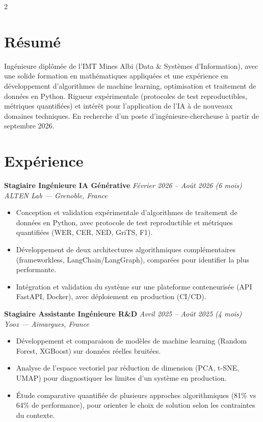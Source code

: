 \documentclass[10.5pt,a4paper]{article}
\newcommand{\sectionrule}{\vspace{-6pt}{\color{accent}\hrule height 1pt}\vspace{3pt}}
\newcommand{\cvexp}[5]{%
  \noindent\textbf{#1} \hfill {\itshape\color{graytext}\small #4}\\
  {\itshape #2 --- #3}\\[-2pt]
  #5
  \vspace{4pt}
}
\begin{document}
\setlength{\columnsep}{1.5em}
\begin{paracol}{2}

\section*{Résumé}
\sectionrule
\justifying
Ingénieure diplômée de l'IMT Mines Albi (Data \& Systèmes d'Information), avec une solide formation en mathématiques appliquées et une expérience en développement d'algorithmes de machine learning, optimisation et traitement de données en Python. Rigueur expérimentale (protocoles de test reproductibles, métriques quantifiées) et intérêt pour l'application de l'IA à de nouveaux domaines techniques. En recherche d'un poste d'ingénieure-chercheuse à partir de septembre 2026.

\section*{Expérience}
\sectionrule

\cvexp{Stagiaire Ingénieure IA Générative}{ALTEN Lab}{Grenoble, France}{Février 2026 -- Août 2026 (6 mois)}{%
  \begin{itemize}[leftmargin=12pt, itemsep=2pt, topsep=0pt, partopsep=0pt, parsep=0pt]
    \item Conception et validation expérimentale d'algorithmes de traitement de données en Python, avec protocole de test reproductible et métriques quantifiées (WER, CER, NED, GriTS, F1).
    \item Développement de deux architectures algorithmiques complémentaires (frameworkless, LangChain/\allowbreak LangGraph), comparées pour identifier la plus performante.
    \item Intégration et validation du système sur une plateforme conteneurisée (API FastAPI, Docker), avec déploiement en production (CI/CD).
  \end{itemize}
}

\cvexp{Stagiaire Assistante Ingénieure R\&D}{Yooz}{Aimargues, France}{Avril 2025 -- Août 2025 (4 mois)}{%
  \begin{itemize}[leftmargin=12pt, itemsep=2pt, topsep=0pt, partopsep=0pt, parsep=0pt]
    \item Développement et comparaison de modèles de machine learning (Random Forest, XGBoost) sur données réelles bruitées.
    \item Analyse de l'espace vectoriel par réduction de dimension (PCA, t-SNE, UMAP) pour diagnostiquer les limites d'un système en production.
    \item Étude comparative quantifiée de plusieurs approches algorithmiques (81\% vs 64\% de performance), pour orienter le choix de solution selon les contraintes du contexte.
  \end{itemize}
}


\end{paracol}
\end{document}
